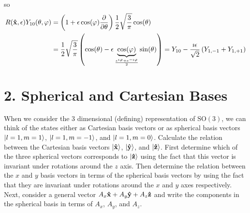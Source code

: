 \documentclass[a4paper,twoside]{article}
\begin{document}
\begin{itemize}
\begin{problem}
            so
            \begin{align}
                R(\vu{x}, \epsilon) Y_{10}(\theta, \varphi) &= \left( 1 + \epsilon \cos(\varphi) \pdv{\theta} \right) \frac{1}{2} \sqrt{\frac{3}{\pi}} \cos(\theta) \\
                &= \frac{1}{2} \sqrt{\frac{3}{\pi}} \left(\cos(\theta) - \epsilon \underbrace{\cos(\varphi)}_{\frac{e^{\imath \varphi} + e^{- \imath \varphi}}{2}} \sin(\theta) \right) = Y_{10} - \frac{\imath \epsilon}{\sqrt{2}} \left( Y_{1,-1} + Y_{1,+1} \right)
            \end{align}
        \end{problem}
\end{itemize}

\section*{2. Spherical and Cartesian Bases}
When we consider the $ 3 $ dimensional (defining) representation of $\text{SO}(3)$, we can think of the states either as Cartesian basis vectors or as spherical basis vectors $\ket{l=1,m=1} $, $\ket{l=1, m=-1} $, and $\ket{l=1,m=0} $. Calculate the relation between the Cartesian basis vectors $\ket{\vu{x}} $, $\ket{\vu{y}} $, and $\ket{\vu{z}} $. First determine which of the three spherical vectors corresponds to $\ket{\vu{z}} $ using the fact that this vector is invariant under rotations around the $ z $ axis. Then determine the relation between the $ x $ and $ y $ basis vectors in terms of the spherical basis vectors by using the fact that they are invariant under rotations around the $ x $ and $ y $ axes respectively. Next, consider a general vector $ A_x \vu{x} + A_y \vu{y} + A_z \vu{z} $ and write the components in the spherical basis in terms of $ A_x $, $ A_y $, and $ A_z $.
\end{document}
